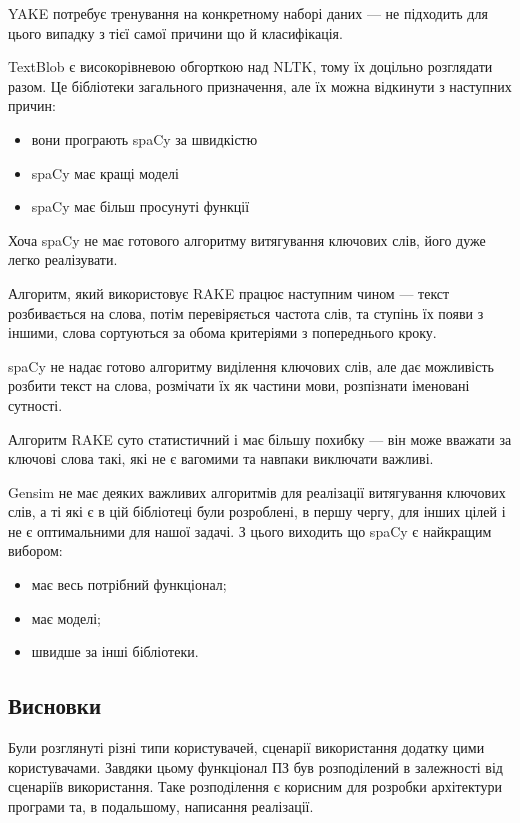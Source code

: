 \documentclass[14pt]{extarticle}
\begin{document}
  YAKE потребує тренування на конкретному наборі даних ---
  не підходить для цього випадку з тієї самої причини що й класифікація.

  TextBlob є високорівневою обгорткою над NLTK,
  тому їх доцільно розглядати разом.
  Це бібліотеки загального призначення,
  але їх можна відкинути з наступних причин:
  \begin{itemize}[labelindent=\dimexpr{}\relax, leftmargin=*]
    \item вони програють spaCy за швидкістю
    \item spaCy має кращі моделі
    \item spaCy має більш просунуті функції
  \end{itemize}

  Хоча spaCy не має готового алгоритму витягування ключових слів,
  його дуже легко реалізувати.

  Алгоритм, який використовує RAKE працює наступним чином ---
  текст розбивається на слова, потім перевіряється частота слів,
  та ступінь їх появи з іншими,
  слова сортуються за обома критеріями з попереднього кроку.

  spaCy не надає готово алгоритму виділення ключових слів,
  але дає можливість розбити текст на слова, розмічати їх як частини мови,
  розпізнати іменовані сутності.

  Алгоритм RAKE суто статистичний і має більшу похибку ---
  він може вважати за ключові слова такі,
  які не є вагомими та навпаки виключати важливі.

  Gensim не має деяких важливих алгоритмів
  для реалізації витягування ключових слів,
  а ті які є в цій бібліотеці були розроблені, в першу чергу,
  для інших цілей і не є оптимальними для нашої задачі.
  З цього виходить що spaCy є найкращим вибором:
  \begin{itemize}[labelindent=\dimexpr{}\relax, leftmargin=*]
    \item має весь потрібний функціонал;
    \item має моделі;
    \item швидше за інші бібліотеки.
  \end{itemize}

  \subsection{Висновки}
  Були розглянуті різні типи користувачей,
  сценарії використання додатку цими користувачами.
  Завдяки цьому функціонал ПЗ був розподілений в залежності
  від сценаріїв використання.
  Таке розподілення є корисним для розробки архітектури програми та,
  в подальшому, написання реалізації.
\end{document}
